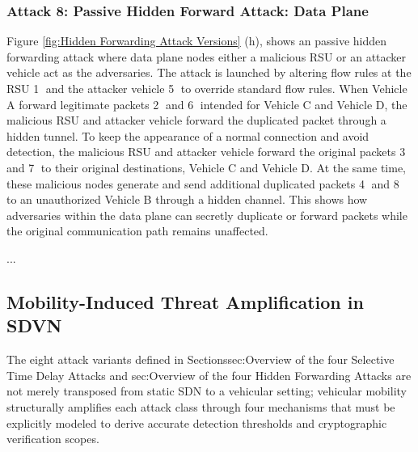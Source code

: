 \documentclass[12pt, a4paper]{report}
\begin{document}
\begin{itemize}
  \subsubsection{Attack 8: Passive Hidden Forward Attack: Data Plane}
    Figure \ref{fig:Hidden Forwarding Attack Versions} (h), shows an passive hidden forwarding attack where data plane nodes either a malicious RSU or an attacker vehicle act as the adversaries. The attack is launched by altering flow rules at the RSU \textcircled{1} and the attacker vehicle \textcircled{5} to override standard flow rules. When Vehicle A forward legitimate packets \textcircled{2} and \textcircled{6} intended for Vehicle C and Vehicle D, the malicious RSU and attacker vehicle forward the duplicated packet through a hidden tunnel. To keep the appearance of a normal connection and avoid detection, the malicious RSU and attacker vehicle forward the original packets \textcircled{3} and \textcircled{7} to their original destinations, Vehicle C and Vehicle D. At the same time, these malicious nodes generate and send additional duplicated packets \textcircled{4} and \textcircled{8} to an unauthorized Vehicle B through a hidden channel. This shows how adversaries within the data plane can secretly duplicate or forward packets while the original communication path remains unaffected.


\end{itemize}
...

\subsection{Mobility-Induced Threat Amplification in SDVN}
\label{sec:mobility_amplification}

The eight attack variants defined in Sections{sec:Overview of the four Selective Time Delay Attacks}
and {sec:Overview of the four Hidden Forwarding Attacks} are not merely transposed from static SDN to a
vehicular setting; vehicular mobility structurally amplifies each
attack class through four mechanisms that must be explicitly modeled
to derive accurate detection thresholds and cryptographic verification
scopes.
\end{document}
